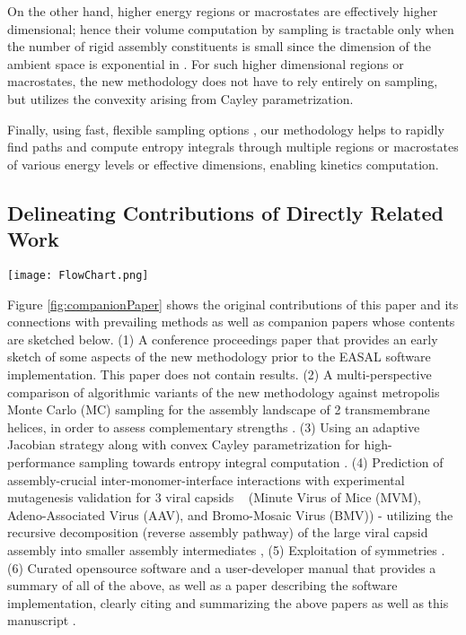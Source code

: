\documentclass[]{article}
\begin{document}
On the other hand, higher energy regions or macrostates are effectively higher
dimensional; hence their volume computation by sampling is tractable only when
the number of rigid assembly constituents  is small since the dimension of
the ambient space is exponential in . For such higher dimensional regions or
macrostates, the new methodology does not have to rely entirely on sampling,
but utilizes the convexity arising from Cayley parametrization.

Finally, using fast, flexible sampling options \cite{Ozkan2014Jacobian}, our
methodology helps to rapidly find paths and compute entropy integrals through
multiple regions or macrostates of various energy levels or effective
dimensions, enabling kinetics computation.

\subsection{Delineating Contributions of Directly Related Work}
\label{sec:app:companionPapers}
\begin{figure*}
\texttt{[image: FlowChart.png]}
\caption{\scriptsize Delineating contributions of directly related work.}
\label{fig:companionPaper}
\end{figure*}

Figure \ref{fig:companionPaper} shows the original contributions of this paper
and its connections with prevailing methods as well as companion papers whose
contents are sketched below. (1) A conference proceedings paper that provides
an early sketch of some aspects of the new methodology prior to the EASAL
software implementation. This paper does not contain results. (2) A
multi-perspective comparison of algorithmic variants of the new methodology
against metropolis Monte Carlo (MC) sampling for the assembly landscape of 2
transmembrane helices, in order to assess complementary strengths
\cite{Ozkan2014MC}. (3) Using an adaptive Jacobian strategy along with convex
Cayley parametrization for high-performance sampling towards entropy integral
computation \cite{Ozkan2014Jacobian}. (4) Prediction of assembly-crucial
inter-monomer-interface interactions with experimental mutagenesis validation
for 3 viral capsids ~\cite{Wu2012, virus2019} (Minute Virus of Mice (MVM),
Adeno-Associated Virus (AAV), and Bromo-Mosaic Virus (BMV)) - utilizing the
recursive decomposition (reverse assembly pathway) of the large viral capsid
assembly into smaller assembly intermediates \cite{sitharam:Assembly, mvs2006},
(5) Exploitation of symmetries \cite{sym8010005}. (6) Curated opensource
software and a user-developer manual that provides a summary of all of the
above, as well as a paper describing the software implementation, clearly
citing and summarizing the above papers as well as this manuscript
\cite{Ozkan:toms}.
\end{document}
